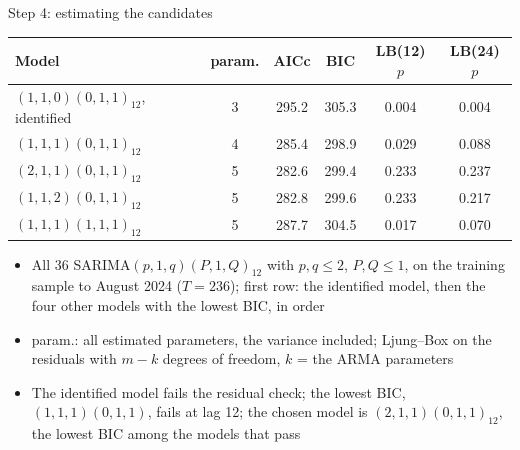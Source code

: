 \begin{frame}{Step 4: estimating the candidates}
\itemsize{\footnotesize}
\begin{center}
\footnotesize
\begin{tabular}{lccccc}
\toprule
\textbf{Model} & param. & AICc & BIC & LB(12) $p$ & LB(24) $p$ \\
\midrule
$(1,1,0)(0,1,1)_{12}$, identified & 3 & 295.2 & 305.3 & 0.004 & 0.004 \\
${(1,1,1)(0,1,1)}_{12}$ & 4 & 285.4 & 298.9 & 0.029 & 0.088 \\
${(2,1,1)(0,1,1)}_{12}$ & 5 & 282.6 & 299.4 & 0.233 & 0.237 \\
${(1,1,2)(0,1,1)}_{12}$ & 5 & 282.8 & 299.6 & 0.233 & 0.217 \\
${(1,1,1)(1,1,1)}_{12}$ & 5 & 287.7 & 304.5 & 0.017 & 0.070 \\
\bottomrule
\end{tabular}
\end{center}
\begin{itemize}
    \item All 36 SARIMA$(p,1,q)(P,1,Q)_{12}$ with $p, q \le 2$, $P, Q \le 1$, on the training sample to August 2024 ($T = 236$); first row: the identified model, then the four other models with the lowest BIC, in order
    \item param.: all estimated parameters, the variance included; Ljung--Box on the residuals with $m - k$ degrees of freedom, $k$ = the ARMA parameters
    \item The identified model fails the residual check; the lowest BIC, $(1,1,1)(0,1,1)$, fails at lag 12; the chosen model is $(2,1,1)(0,1,1)_{12}$, the lowest BIC among the models that pass
\end{itemize}
\end{frame}

